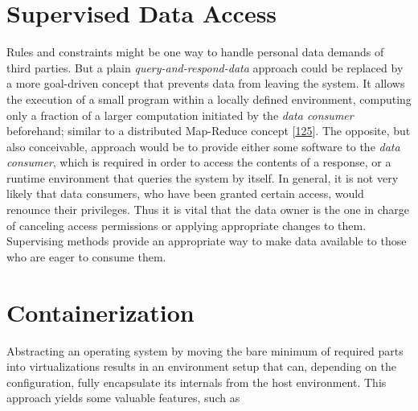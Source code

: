 \documentclass[12pt,english,a4paper,titlepage,cleardoublepage=empty,dottedtoc]{report}
\begin{document}
\hypertarget{supervised-data-access}{\section{Supervised Data
Access}\label{supervised-data-access}}

Rules and constraints might be one way to handle personal data demands
of third parties. But a plain \emph{query-and-respond-data} approach
could be replaced by a more goal-driven concept that prevents data from
leaving the system. It allows the execution of a small program within a
locally defined environment, computing only a fraction of a larger
computation initiated by the \emph{data consumer} beforehand; similar to
a distributed Map-Reduce concept
{[}\protect\hyperlink{ref-paper_2004_distributed-mapreduce}{125}{]}. The
opposite, but also conceivable, approach would be to provide either some
software to the \emph{data consumer}, which is required in order to
access the contents of a response, or a runtime environment that queries
the system by itself. In general, it is not very likely that data
consumers, who have been granted certain access, would renounce their
privileges. Thus it is vital that the data owner is the one in charge of
canceling access permissions or applying appropriate changes to them.
Supervising methods provide an appropriate way to make data available to
those who are eager to consume them.

\section{Containerization}\label{containerization}

Abstracting an operating system by moving the bare minimum of required
parts into virtualizations results in an environment setup that can,
depending on the configuration, fully encapsulate its internals from the
host environment. This approach yields some valuable features, such as
\end{document}
